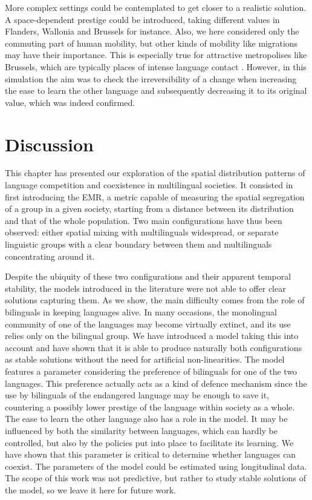 \documentclass[../thesis.tex]{subfiles}
\begin{document}
More complex settings could be contemplated to get closer to a realistic solution. A
space-dependent prestige could be introduced, taking different values in Flanders,
Wallonia and Brussels for instance. Also, we here considered only the commuting part of
human mobility, but other kinds of mobility like migrations may have their importance.
This is especially true for attractive metropolises like Brussels, which are typically
places of intense language contact \cite{SimonCitiesTranslation2011}. However, in this
simulation the aim was to check the irreversibility of a change when increasing the ease
to learn the other language and subsequently decreasing it to its original value, which
was indeed confirmed. 



\section{Discussion}
\label{sec:multiling_discussion}
This chapter has presented our exploration of the spatial distribution patterns of
language competition and coexistence in multilingual societies. It consisted in first
introducing the \ac{EMR}, a metric capable of measuring the spatial
segregation of a group in a given society, starting from a distance between its
distribution and that of the whole population. Two main configurations have thus been
observed: either spatial mixing with multilinguals widespread, or separate linguistic
groups with a clear boundary between them and multilinguals concentrating around it. 

Despite the ubiquity of these two configurations and their apparent temporal stability,
the models introduced in the literature were not able to offer clear solutions capturing
them. As we show, the main difficulty comes from the role of bilinguals in keeping
languages alive. In many occasions, the monolingual community of one of the languages
may become virtually extinct, and its use relies only on the bilingual group. We have
introduced a model taking this into account and have shown that it is able to produce
naturally both configurations as stable solutions without the need for artificial
non-linearities. The model features a parameter considering the preference of bilinguals
for one of the two languages. This preference actually acts as a kind of defence
mechanism since the use by bilinguals of the endangered language may be enough to save
it, countering a possibly lower prestige of the language within society as a whole. The
ease to learn the other language also has a role in the model. It may be influenced by
both the similarity between languages, which can hardly be controlled, but also by the
policies put into place to facilitate its learning. We have shown that this parameter is
critical to determine whether languages can coexist. The parameters of the model could
be estimated using longitudinal data. The scope of this work was not predictive, but
rather to study stable solutions of the model, so we leave it here for future work.
\end{document}
